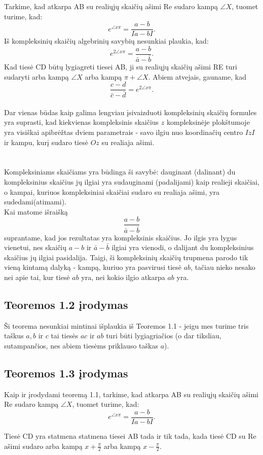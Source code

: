 Tarkime, kad atkarpa AB su realiųjų skaičių ašimi Re sudaro kampą $\angle X$, tuomet
turime, kad:
$$ e^{\angle x \pi } = \frac {a-b} { Ia-bI }.$$
Iš kompleksinių skaičių algebrinių savybių nesunkiai plaukia, kad:
$$ e^{2 \angle x \pi} = \frac { a-b} { \bar a - \bar b }.$$
Kad tiesė CD būtų lygiagreti tiesei AB, ji su realiųjų skaičių ašimi RE turi sudaryti
arba kampą $\angle X$ arba kampą $ \pi + \angle X$. Abiem atvejais, gauname, kad
$$ \frac{c-d}{\bar c - \bar d } = e^{2 \angle x \pi}.$$
\\
Dar vienas būdas kaip galima lengviau įsivaizduoti kompleksinių skaičių formules
yra suprasti, kad kiekvienas kompleksinis skaičius $z$ kompleksinėje plokštumoje 
yra visiškai apibrėžtas dviem parametrais - savo ilgiu nuo koordinačių centro $IzI$ ir
kampu, kurį sudaro tiesė $Oz$ su realiaja ašimi.
\\
\\
\\
Kompleksiniams skaičiams yra būdinga ši savybė:
dauginant (dalinant) du kompleksinius skaičius jų ilgiai yra sudauginami (padalijami)
kaip realieji skaičiai, o kampai, kuriuos kompleksiniai skaičiai
sudaro su realiaja ašimi, yra sudedami(atimami).
\\
Kai matome išraišką
$$ \frac{a-b}{\bar a - \bar b} $$
suprantame, kad jos rezultatas yra kompleksinis skaičius.
Jo ilgis yra lygus vienetui, nes skaičių $a-b$ ir $\bar a - \bar b$
ilgiai yra vienodi, o dalijant du kompleksinius skaičius jų ilgiai pasidalija.
Taigi, ši kompleksinių skaičių trupmena parodo tik vieną kintamą
dalyką - kampą, kuriuo yra pasvirusi tiesė $ab$, tačiau nieko nesako nei 
apie tai, kur tiesė $ab$ yra, nei kokio ilgio atkarpa $ab$ yra.
\subsection*{Teoremos 1.2 įrodymas}
Ši teorema nesunkiai mintinai išplaukia iš Teoremos 1.1 - jeigu mes turime tris taškus $a, b$ ir $c$ tai tiesės $ac$ ir $ab$ turi būti lygiagriačios (o dar tiksliau, sutampančios, nes abiem tiesėms priklauso taškas $a$).
\subsection*{Teoremos 1.3 įrodymas}

Kaip ir įrodydami teoremą 1.1, tarkime, kad atkarpa AB su realiųjų skaičių ašimi Re sudaro kampą $\angle X$, tuomet turime, kad:
$$ e^{\angle x \pi } = \frac {a-b} { Ia-bI }.$$

Tiesė CD yra statmena statmena tiesei AB tada ir tik
tada, kada tiesė CD su Re ašimi sudaro arba kampą $x+ \frac{\pi}{2}$
arba kampą $x- \frac{\pi}{2}$.

